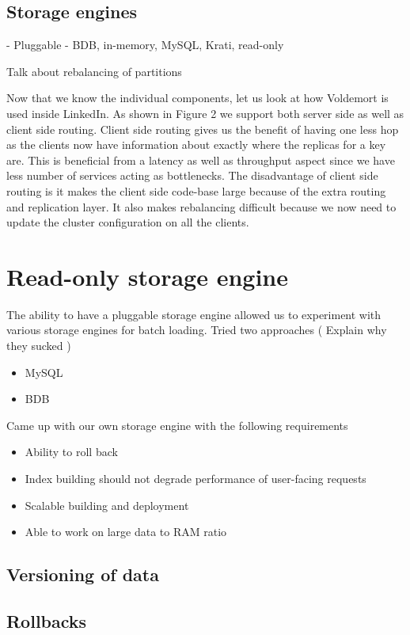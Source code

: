 \documentclass[10pt,twocolumn,preprint,natbib,authoryear]{sigplanconf}
\begin{document}
\subsection {Storage engines}
- Pluggable 
- BDB, in-memory, MySQL, Krati, read-only


Talk about rebalancing of partitions 

Now that we know the individual components, let us look at how Voldemort is used inside LinkedIn. As shown in Figure 2 we support both server side as well as client side routing. Client side routing gives us the benefit of having one less hop as the clients now have information about exactly where the replicas for a key are. This is beneficial from a latency as well as throughput aspect since we have less number of services acting as bottlenecks. The disadvantage of client side routing is it makes the client side code-base large because of the extra routing and replication layer. It also makes rebalancing difficult because we now need to update the cluster configuration on all the clients. 

\section{Read-only storage engine}

The ability to have a pluggable storage engine allowed us to experiment with various storage engines for batch loading. 
Tried two approaches ( Explain why they sucked )
\begin{itemize}
	\item MySQL
	\item BDB
\end{itemize}

Came up with our own storage engine with the following requirements
\begin{itemize}
\item Ability to roll back
\item Index building should not degrade performance of user-facing requests
\item Scalable building and deployment
\item Able to work on large data to RAM ratio
\end{itemize}

\subsection{Versioning of data}

\subsection{Rollbacks}
\end{document}
